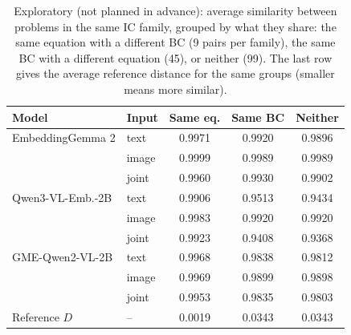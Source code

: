 \begin{table}[h]
\centering
\caption{Exploratory (not planned in advance): average similarity between problems in the same IC family, grouped by what they share: the same equation with a different BC (9 pairs per family), the same BC with a different equation (45), or neither (99). The last row gives the average reference distance for the same groups (smaller means more similar).}
\label{tab:factors}
\small
\begin{tabular}{llccc}
\toprule
Model & Input & Same eq. & Same BC & Neither \\
\midrule
EmbeddingGemma 2 & text & 0.9971 & 0.9920 & 0.9896 \\
 & image & 0.9999 & 0.9989 & 0.9989 \\
 & joint & 0.9960 & 0.9930 & 0.9902 \\
Qwen3-VL-Emb.-2B & text & 0.9906 & 0.9513 & 0.9434 \\
 & image & 0.9983 & 0.9920 & 0.9920 \\
 & joint & 0.9923 & 0.9408 & 0.9368 \\
GME-Qwen2-VL-2B & text & 0.9968 & 0.9838 & 0.9812 \\
 & image & 0.9969 & 0.9899 & 0.9898 \\
 & joint & 0.9953 & 0.9835 & 0.9803 \\
\midrule
Reference $D$ & -- & 0.0019 & 0.0343 & 0.0343 \\
\bottomrule
\end{tabular}
\end{table}
